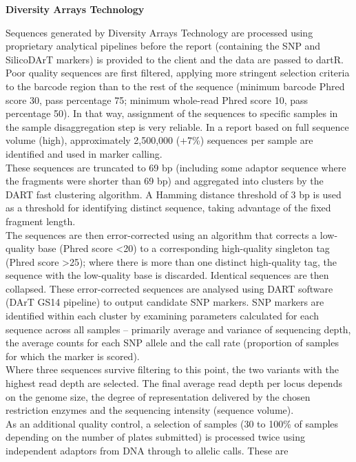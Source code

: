 \documentclass[
  letterpaper,
  DIV=11,
  numbers=noendperiod]{scrreprt}
\begin{document}
\textbf{Diversity Arrays Technology}

Sequences generated by Diversity Arrays Technology are processed using
proprietary analytical pipelines before the report (containing the SNP
and SilicoDArT markers) is provided to the client and the data are
passed to dartR.\\
Poor quality sequences are first filtered, applying more stringent
selection criteria to the barcode region than to the rest of the
sequence (minimum barcode Phred score 30, pass percentage 75; minimum
whole-read Phred score 10, pass percentage 50). In that way, assignment
of the sequences to specific samples in the sample disaggregation step
is very reliable. In a report based on full sequence volume (high),
approximately 2,500,000 (+7\%) sequences per sample are identified and
used in marker calling.\\
These sequences are truncated to 69 bp (including some adaptor sequence
where the fragments were shorter than 69 bp) and aggregated into
clusters by the DART fast clustering algorithm. A Hamming distance
threshold of 3 bp is used as a threshold for identifying distinct
sequence, taking advantage of the fixed fragment length.\\
The sequences are then error-corrected using an algorithm that corrects
a low-quality base (Phred score \textless20) to a corresponding
high-quality singleton tag (Phred score \textgreater25); where there is
more than one distinct high-quality tag, the sequence with the
low-quality base is discarded. Identical sequences are then collapsed.
These error-corrected sequences are analysed using DART software (DArT
GS14 pipeline) to output candidate SNP markers. SNP markers are
identified within each cluster by examining parameters calculated for
each sequence across all samples -- primarily average and variance of
sequencing depth, the average counts for each SNP allele and the call
rate (proportion of samples for which the marker is scored).\\
Where three sequences survive filtering to this point, the two variants
with the highest read depth are selected. The final average read depth
per locus depends on the genome size, the degree of representation
delivered by the chosen restriction enzymes and the sequencing intensity
(sequence volume).\\
As an additional quality control, a selection of samples (30 to 100\% of
samples depending on the number of plates submitted) is processed twice
using independent adaptors from DNA through to allelic calls. These are
\end{document}
